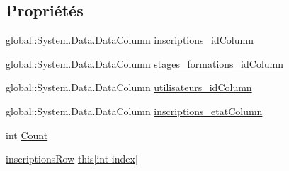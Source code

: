 \subsection*{Propriétés}
\begin{DoxyCompactItemize}
\item 
global\+::\+System.\+Data.\+Data\+Column \hyperlink{classforma_1_1formadb_data_set_1_1inscriptions_data_table_a9fbd0c9387a1c1a3dd53aa4ba82f96b9}{inscriptions\+\_\+id\+Column}
\item 
global\+::\+System.\+Data.\+Data\+Column \hyperlink{classforma_1_1formadb_data_set_1_1inscriptions_data_table_a529c11ab1e86a0b980a1ccee15601f85}{stages\+\_\+formations\+\_\+id\+Column}
\item 
global\+::\+System.\+Data.\+Data\+Column \hyperlink{classforma_1_1formadb_data_set_1_1inscriptions_data_table_ae10dfa254d4b3dbf2661a7806721bf99}{utilisateurs\+\_\+id\+Column}
\item 
global\+::\+System.\+Data.\+Data\+Column \hyperlink{classforma_1_1formadb_data_set_1_1inscriptions_data_table_aaf439206c55adf23aeeab504630088e4}{inscriptions\+\_\+etat\+Column}
\item 
int \hyperlink{classforma_1_1formadb_data_set_1_1inscriptions_data_table_aa7c50459a19f22ce654632aa15a4b942}{Count}
\item 
\hyperlink{classforma_1_1formadb_data_set_1_1inscriptions_row}{inscriptions\+Row} \hyperlink{classforma_1_1formadb_data_set_1_1inscriptions_data_table_aabeb2165b2156555c66d19fe6126c905}{this\mbox{[}int index\mbox{]}}
\end{DoxyCompactItemize}
